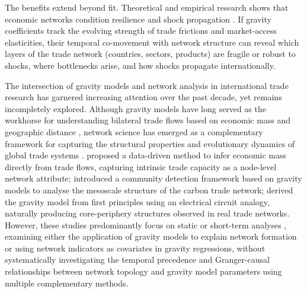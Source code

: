 \documentclass[preprint, 3p,
authoryear]{elsarticle} %
\begin{document}
The benefits extend beyond fit. Theoretical and empirical research shows
that economic networks condition resilience and shock propagation
\citep{acemoglu2012, carvalho2014, digiovanni2020, boehm2019, bonadio2021, carvalho2021, vespignani2012}.
If gravity coefficients track the evolving strength of trade frictions
and market-access elasticities, their temporal co-movement with network
structure can reveal which layers of the trade network (countries,
sectors, products) are fragile or robust to shocks, where bottlenecks
arise, and how shocks propagate internationally.

The intersection of gravity models and network analysis in international
trade research has garnered increasing attention over the past decade,
yet remains incompletely explored. Although gravity models have long
served as the workhorse for understanding bilateral trade flows based on
economic mass and geographic distance \citep{anderson2003}, network
science has emerged as a complementary framework for capturing the
structural properties and evolutionary dynamics of global trade systems
\citep[\citet{serrano2003topology}]{sgrignoli2015relation}.
\citet{lee2025selfconsistent} proposed a data-driven method to infer
economic mass directly from trade flows, capturing intrinsic trade
capacity as a node-level network attribute; \citet{flori2025carbon}
introduced a community detection framework based on gravity models to
analyse the mesoscale structure of the carbon trade network;
\citet{robinson2025electrical} derived the gravity model from first
principles using an electrical circuit analogy, naturally producing
core-periphery structures observed in real trade networks. However,
these studies predominantly focus on static or short-term analyses
\citep{he2024symphony, fang2023global, jiang2023structural}, examining
either the application of gravity models to explain network formation or
using network indicators as covariates in gravity regressions, without
systematically investigating the temporal precedence and Granger-causal
relationships between network topology and gravity model parameters
using multiple complementary methods.
\end{document}
